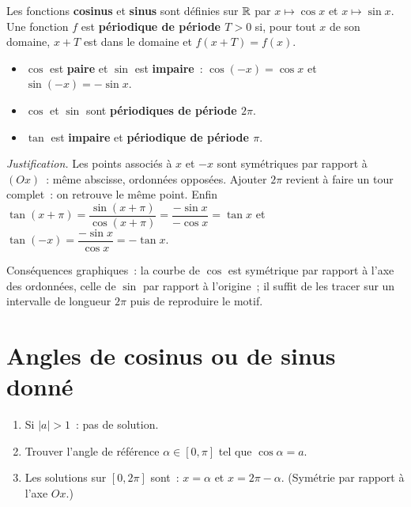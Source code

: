 \begin{defn}
Les fonctions \textbf{cosinus} et \textbf{sinus} sont d\'efinies sur $\mathbb{R}$ par
$x\mapsto\cos x$ et $x\mapsto\sin x$.
Une fonction $f$ est \textbf{p\'eriodique de p\'eriode $T>0$} si, pour tout $x$
de son domaine, $x+T$ est dans le domaine et $f(x+T)=f(x)$.
\end{defn}

\begin{prop}
\begin{itemize}
  \item $\cos$ est \textbf{paire} et $\sin$ est \textbf{impaire}~:
        $\cos(-x)=\cos x$ et $\sin(-x)=-\sin x$.
  \item $\cos$ et $\sin$ sont \textbf{p\'eriodiques de p\'eriode $2\pi$}.
  \item $\tan$ est \textbf{impaire} et \textbf{p\'eriodique de p\'eriode $\pi$}.
\end{itemize}
\end{prop}

\noindent\textit{Justification.} Les points associ\'es \`a $x$ et $-x$ sont
sym\'etriques par rapport \`a $(Ox)$~: m\^eme abscisse, ordonn\'ees oppos\'ees.
Ajouter $2\pi$ revient \`a faire un tour complet~: on retrouve le m\^eme point.
Enfin $\tan(x+\pi)=\dfrac{\sin(x+\pi)}{\cos(x+\pi)}=\dfrac{-\sin x}{-\cos x}=\tan x$
et $\tan(-x)=\dfrac{-\sin x}{\cos x}=-\tan x$.

\begin{remarque}
Cons\'equences graphiques~: la courbe de $\cos$ est sym\'etrique par rapport \`a
l'axe des ordonn\'ees, celle de $\sin$ par rapport \`a l'origine~; il suffit de
les tracer sur un intervalle de longueur $2\pi$ puis de reproduire le motif.
\end{remarque}

\section{Angles de cosinus ou de sinus donn\'e}

\begin{methode}[R\'esoudre $\cos x = a$ sur {$[0, 2\pi]$}]
\begin{enumerate}
  \item Si $|a|>1$~: pas de solution.
  \item Trouver l'angle de r\'ef\'erence $\alpha\in[0,\pi]$ tel que $\cos\alpha=a$.
  \item Les solutions sur $[0,2\pi]$ sont~: $x=\alpha$ et $x=2\pi-\alpha$.
        (Sym\'etrie par rapport \`a l'axe $Ox$.)
\end{enumerate}
\end{methode}

